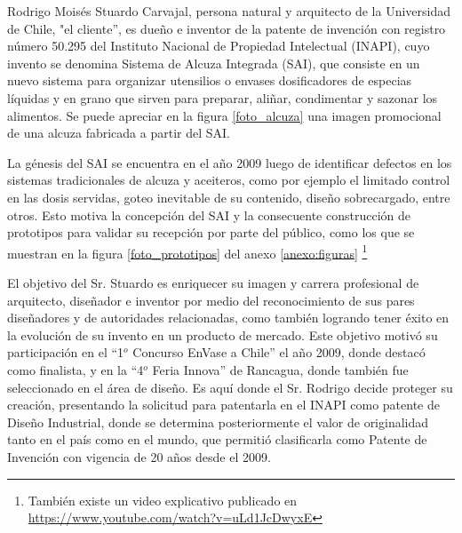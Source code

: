 Rodrigo Moisés Stuardo Carvajal, persona natural y arquitecto de la Universidad de Chile, "el cliente'', es dueño e inventor de la patente de invención con registro número 50.295 del Instituto Nacional de Propiedad Intelectual (INAPI), cuyo invento se denomina Sistema de Alcuza Integrada (SAI), que consiste en un nuevo sistema para organizar utensilios o envases dosificadores de especias líquidas y en grano que sirven para preparar, aliñar, condimentar y sazonar los alimentos. Se puede apreciar en la figura \ref{foto_alcuza} una imagen promocional de una alcuza fabricada a partir del SAI.

La génesis del SAI se encuentra en el año 2009 luego de identificar defectos en los sistemas tradicionales de alcuza y aceiteros, como por ejemplo el limitado control en las dosis servidas, goteo inevitable de su contenido, diseño sobrecargado, entre otros. Esto motiva la concepción del SAI y la consecuente construcción de prototipos para validar su recepción por parte del público, como los que se muestran en la figura \ref{foto_prototipos} del anexo \ref{anexo:figuras} \footnote{También existe un video explicativo publicado en \url{https://www.youtube.com/watch?v=uLd1JcDwyxE}}

El objetivo del Sr. Stuardo es enriquecer su imagen y carrera profesional de arquitecto, diseñador e inventor por medio del reconocimiento de sus pares diseñadores y de autoridades relacionadas, como también logrando tener éxito en la evolución de su invento en un producto de mercado. Este objetivo motivó su participación en el  “1$^{o}$  Concurso EnVase a Chile” el año 2009, donde destacó como finalista, y en la “4$^{o}$ Feria Innova” de Rancagua, donde también fue seleccionado en el área de diseño. Es aquí donde el Sr. Rodrigo decide proteger su creación, presentando la solicitud para patentarla en el INAPI como patente de Diseño Industrial, donde se determina posteriormente el valor de originalidad tanto en el país como en el mundo, que permitió clasificarla como Patente de Invención con vigencia de 20 años desde el 2009.

